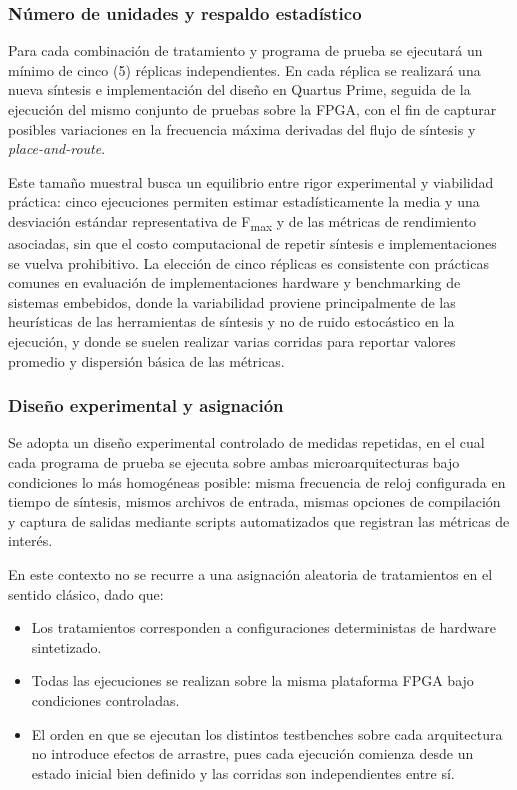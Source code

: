 \subsubsection{Número de unidades y respaldo estadístico}

Para cada combinación de tratamiento y programa de prueba se ejecutará un mínimo de cinco (5) réplicas independientes. En cada réplica se realizará una nueva síntesis e implementación del diseño en Quartus Prime, seguida de la ejecución del mismo conjunto de pruebas sobre la FPGA, con el fin de capturar posibles variaciones en la frecuencia máxima derivadas del flujo de síntesis y \textit{place-and-route}.

Este tamaño muestral busca un equilibrio entre rigor experimental y viabilidad práctica: cinco ejecuciones permiten estimar estadísticamente la media y una desviación estándar representativa de F\textsubscript{max} y de las métricas de rendimiento asociadas, sin que el costo computacional de repetir síntesis e implementaciones se vuelva prohibitivo. La elección de cinco réplicas es consistente con prácticas comunes en evaluación de implementaciones hardware y benchmarking de sistemas embebidos, donde la variabilidad proviene principalmente de las heurísticas de las herramientas de síntesis y no de ruido estocástico en la ejecución, y donde se suelen realizar varias corridas para reportar valores promedio y dispersión básica de las métricas.

\subsubsection{Diseño experimental y asignación}

Se adopta un diseño experimental controlado de medidas repetidas, en el cual cada programa de prueba se ejecuta sobre ambas microarquitecturas bajo condiciones lo más homogéneas posible: misma frecuencia de reloj configurada en tiempo de síntesis, mismos archivos de entrada, mismas opciones de compilación y captura de salidas mediante scripts automatizados que registran las métricas de interés.

En este contexto no se recurre a una asignación aleatoria de tratamientos en el sentido clásico, dado que:
\begin{itemize}
    \item Los tratamientos corresponden a configuraciones deterministas de hardware sintetizado.
    \item Todas las ejecuciones se realizan sobre la misma plataforma FPGA bajo condiciones controladas.
    \item El orden en que se ejecutan los distintos testbenches sobre cada arquitectura no introduce efectos de arrastre, pues cada ejecución comienza desde un estado inicial bien definido y las corridas son independientes entre sí.
\end{itemize}

